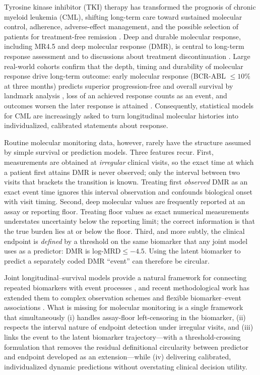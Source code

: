 \documentclass[11pt]{article}
\begin{document}
Tyrosine kinase inhibitor (TKI) therapy has transformed the prognosis of
chronic myeloid leukemia (CML), shifting long-term care toward sustained
molecular control, adherence, adverse-effect management, and the possible
selection of patients for treatment-free remission
\cite{Hochhaus2020ELN,Jabbour2025JAMAReview,Haddad2026Algorithms,Senapati2023CMLManagement}.
Deep and durable molecular response, including MR4.5 and deep molecular
response (DMR), is central to long-term response assessment and to
discussions about treatment discontinuation
\cite{Hughes2014EarlyMolecularResponse,Rasekh2026TFRPredictor,Ono2026MR45,Takahashi2026JSKI}.
Large real-world cohorts confirm that the depth, timing and durability of
molecular response drive long-term outcome: early molecular response
(BCR-ABL $\le 10\%$ at three months) predicts superior progression-free and
overall survival by landmark analysis
\cite{Hanfstein2012EMR,Ohm2012Landmark}, loss of an achieved response counts
as an event, and outcomes worsen the later response is attained
\cite{Li2014TKIEfficacy}.
Consequently, statistical models for CML are increasingly asked to turn
longitudinal molecular histories into individualized, calibrated
statements about response.

Routine molecular monitoring data, however, rarely have the structure
assumed by simple survival or prediction models. Three features recur.
First, measurements are obtained at \emph{irregular} clinical visits, so
the exact time at which a patient first attains DMR is never observed;
only the interval between two visits that brackets the transition is
known. Treating first \emph{observed} DMR as an exact event time ignores
this interval observation and confounds biological onset with visit
timing. Second, deep molecular values are frequently reported at an assay
or reporting floor. Treating floor values as exact numerical measurements
understates uncertainty below the reporting limit; the correct
information is that the true burden lies at or below the floor. Third, and
more subtly, the clinical endpoint is \emph{defined} by a threshold on the
same biomarker that any joint model uses as a predictor: DMR is
$\text{log-MRD} \le -4.5$. Using the latent biomarker to predict a
separately coded DMR ``event'' can therefore be circular.

Joint longitudinal--survival models provide a natural framework for
connecting repeated biomarkers with event processes
\cite{Wulfsohn1997JointModel,Rizopoulos2016JMbayes}, and recent
methodological work has extended them to complex observation schemes and
flexible biomarker--event associations
\cite{Lovblom2026MixedObservationJointModel,Niu2026QuantileJointModel}.
What is missing for molecular monitoring is a single framework that
simultaneously (i) handles assay-floor left-censoring in the biomarker,
(ii) respects the interval nature of endpoint detection under irregular
visits, and (iii) links the event to the latent biomarker
trajectory---with a threshold-crossing formulation that removes the residual
definitional circularity between predictor and endpoint developed as an
extension---while (iv) delivering calibrated, individualized dynamic
predictions without overstating clinical decision utility.
\end{document}
